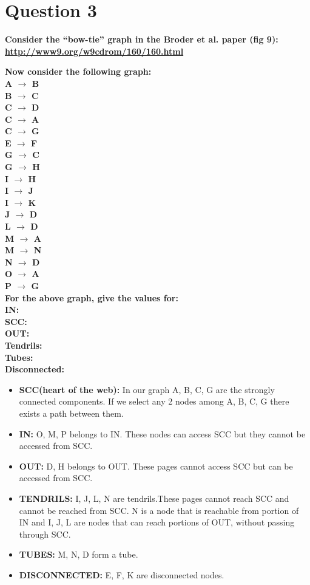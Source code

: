 \chapter{Question 3}
\label{available-representation}

\textbf{Consider the ``bow-tie'' graph in the Broder et al. paper (fig 9): {\url{http://www9.org/w9cdrom/160/160.html}}}

\textbf{Now consider the following graph:\\
 	A $\longrightarrow$ B\\
    B $\longrightarrow$ C\\
    C $\longrightarrow$ D\\
    C $\longrightarrow$ A\\
    C $\longrightarrow$ G\\
    E $\longrightarrow$ F\\
    G $\longrightarrow$ C\\
    G $\longrightarrow$ H\\
    I $\longrightarrow$ H\\
    I $\longrightarrow$ J\\
    I $\longrightarrow$ K\\
    J $\longrightarrow$ D\\
    L $\longrightarrow$ D\\
    M $\longrightarrow$ A\\
    M $\longrightarrow$ N\\
    N $\longrightarrow$ D\\
    O $\longrightarrow$ A\\
    P $\longrightarrow$ G\\
    For the above graph, give the values for:\\
    IN: \\
    SCC: \\
    OUT: \\
    Tendrils:\\ 
    Tubes: \\
    Disconnected:\\}

\begin{itemize}
\item \textbf{SCC(heart of the web):} In our graph A, B, C, G are the strongly connected components. If we select any 2 nodes among A, B, C, G there exists a path between them.
\item \textbf{IN:} O, M, P belongs to IN. These nodes can access SCC but they cannot be accessed from SCC.
\item \textbf{OUT:} D, H belongs to OUT. These pages cannot access SCC but can be accessed from SCC.
\item \textbf{TENDRILS:} I, J, L, N are tendrils.These pages cannot reach SCC and cannot be reached from SCC. N is a node that is reachable from  portion of IN and I, J, L are nodes that can reach portions of OUT, without passing through SCC. 
\item \textbf{TUBES:}  M, N, D form a tube.
\item \textbf{DISCONNECTED:} E, F, K are disconnected nodes.
\end{itemize}




